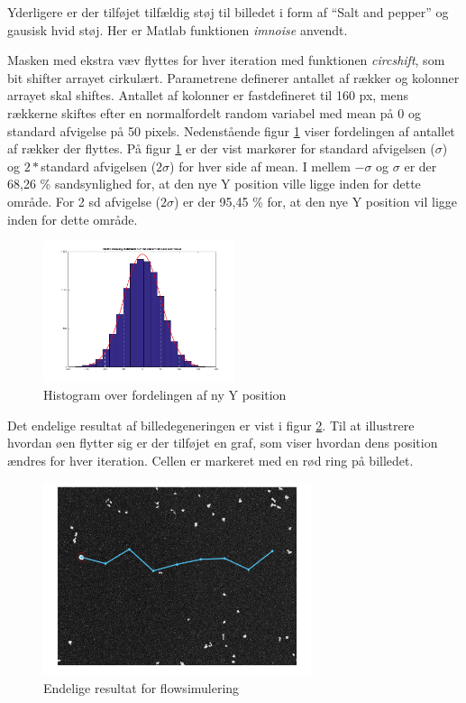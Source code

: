 Yderligere er der tilføjet tilfældig støj til billedet i form af “Salt and pepper” og gausisk hvid støj. Her er Matlab funktionen \textit{imnoise} anvendt. 

Masken med ekstra væv flyttes for hver iteration med funktionen \textit{circshift}, som bit shifter arrayet cirkulært. Parametrene definerer antallet af rækker og kolonner arrayet skal shiftes.  Antallet af kolonner er fastdefineret til 160 px, mens rækkerne skiftes efter en normalfordelt random variabel med mean på 0 og standard afvigelse på 50 pixels. Nedenstående figur \ref{fig:histfit} viser fordelingen af antallet af rækker der flyttes. På figur \ref{fig:histfit} er der vist markører for standard afvigelsen ($\sigma$) og $2*$standard afvigelsen ($2\sigma$) for hver side af mean. I mellem $-\sigma$ og $\sigma$ er der 68,26 \% sandsynlighed for, at den nye Y position ville ligge inden for dette område. For 2 sd afvigelse ($2\sigma$) er der 95,45 \% for, at den nye Y position vil ligge inden for dette område.

\begin{figure}[H]
	\centering
	\includegraphics[width=0.5\textwidth]{billeder/software/histfit.png}
	\caption{Histogram over fordelingen af ny Y position}
	\label{fig:histfit}
\end{figure}

Det endelige resultat af billedegeneringen er vist i figur \ref{fig:finalresult}. Til at illustrere hvordan øen flytter sig er der tilføjet en graf, som viser hvordan dens position ændres for hver iteration. Cellen er markeret med en rød ring på billedet.

\begin{figure}[H]
	\centering
	\includegraphics[width=0.7\textwidth]{billeder/software/final.png}
	\caption{Endelige resultat for flowsimulering}
	\label{fig:finalresult}
\end{figure}


